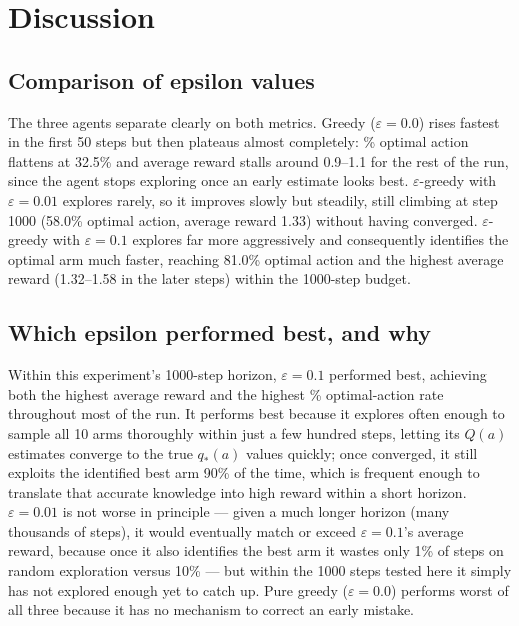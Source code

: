 \documentclass[11pt]{article}
\begin{document}
\clearpage
\section{Discussion}

\subsection{Comparison of epsilon values}
The three agents separate clearly on both metrics. Greedy ($\varepsilon = 0.0$) rises fastest
in the first 50 steps but then plateaus almost completely: \% optimal action
flattens at 32.5\% and average reward stalls around 0.9--1.1 for the rest of the
run, since the agent stops exploring once an early estimate looks best. $\varepsilon$-greedy
with $\varepsilon = 0.01$ explores rarely, so it improves slowly but steadily, still climbing
at step 1000 (58.0\% optimal action, average reward 1.33)
without having converged. $\varepsilon$-greedy with $\varepsilon = 0.1$ explores far more
aggressively and consequently identifies the optimal arm much faster, reaching
81.0\% optimal action and the highest average reward
(1.32--1.58 in the later steps) within the 1000-step budget.

\subsection{Which epsilon performed best, and why}
Within this experiment's 1000-step horizon, $\varepsilon = 0.1$ performed best, achieving both
the highest average reward and the highest \% optimal-action rate throughout most of the run.
It performs best because it explores often enough to sample all 10 arms thoroughly within just
a few hundred steps, letting its $Q(a)$ estimates converge to the true $q_*(a)$ values
quickly; once converged, it still exploits the identified best arm 90\% of the time, which is
frequent enough to translate that accurate knowledge into high reward within a short horizon.
$\varepsilon = 0.01$ is not worse in principle --- given a much longer horizon (many thousands
of steps), it would eventually match or exceed $\varepsilon = 0.1$'s average reward, because
once it also identifies the best arm it wastes only 1\% of steps on random exploration versus
10\% --- but within the 1000 steps tested here it simply has not explored enough yet to catch
up. Pure greedy ($\varepsilon = 0.0$) performs worst of all three because it has no mechanism
to correct an early mistake.
\end{document}
